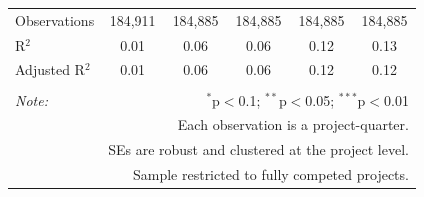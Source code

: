 \documentclass[
]{article}
\begin{document}
\begin{table}[H]
\begin{tabular}{@{\extracolsep{-2pt}}lccccc}
Observations & 184,911 & 184,885 & 184,885 & 184,885 & 184,885 \\ 
R$^{2}$ & 0.01 & 0.06 & 0.06 & 0.12 & 0.13 \\ 
Adjusted R$^{2}$ & 0.01 & 0.06 & 0.06 & 0.12 & 0.12 \\ 
\hline 
\hline \\[-1.8ex] 
\textit{Note:}  & \multicolumn{5}{r}{$^{*}$p$<$0.1; $^{**}$p$<$0.05; $^{***}$p$<$0.01} \\ 
 & \multicolumn{5}{r}{Each observation is a project-quarter.} \\ 
 & \multicolumn{5}{r}{SEs are robust and clustered at the project level.} \\ 
 & \multicolumn{5}{r}{Sample restricted to fully competed projects.} \\ 
\end{tabular} 
\end{table}
\end{document}
